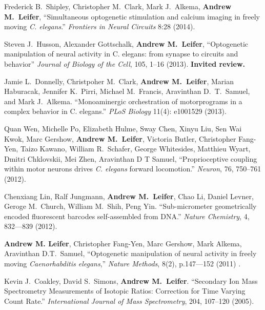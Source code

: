 \documentclass[11pt]{article}
\makeatletter
\newlength{\bibhang}
\newlength{\bibsep}
\newcounter{Lcount}
 {\@listi \global\bibsep\itemsep \global\advance\bibsep by\parsep}
\newenvironment{bibsection}%
        {\begin{list}{\arabic{Lcount}.}{%
       \usecounter{Lcount}%
       \setlength\labelwidth{-0.5em}%
       \setlength{\leftmargin}{\bibhang}%
       \setlength{\itemindent}{-\leftmargin}%
       \setlength{\itemsep}{\bibsep}%
       \setlength{\parsep}{\z@}%
        \setlength{\partopsep}{0pt}%
        \setlength{\topsep}{0pt}}}
        {\end{list}\vspace{-.6\baselineskip}}
\makeatother
\begin{document}
\begin{bibsection}
	
\item Frederick B.~Shipley, Christopher M.~Clark,  Mark J.~Alkema, \textbf{Andrew M.~Leifer}, ``Simultaneous optogenetic stimulation and calcium imaging in freely moving \textit{C. elegans}.'' \emph{Frontiers in Neural Circuits} 8:28 (2014).
	
\item Steven J.~Husson, Alexander Gottschalk, \textbf{Andrew M.~Leifer}, ``Optogenetic manipulation of neural activity in C. elegans: from synapse to circuits and behavior'' \emph{Journal of Biology of the Cell}, 105, 1--16 (2013).  \textbf{Invited review.}

\item Jamie L.~Donnelly, Christpoher M.~Clark, \textbf{Andrew M.~Leifer}, Marian Haburacak, Jennifer K.~Pirri, Michael M.~Francis, Aravinthan D.~T.~Samuel, and Mark J.~Alkema. ``Monoaminergic orchestration of motorprograms in a complex behavior in C. elegans.'' \emph{PLoS Biology}  11(4): e1001529 (2013).	

\item Quan Wen, Michelle Po, Elizabeth Hulme, Sway Chen, Xinyu Liu, Sen Wai Kwok, Marc Gershow,  \textbf{Andrew M.~Leifer}, Victoria Butler, Christopher Fang-Yen, Taizo Kawano, William R.~Schafer, George Whitesides, Matthieu Wyart, Dmitri Chklovskii, Mei Zhen, Aravinthan D T Samuel, ``Proprioceptive coupling within motor neurons drives \emph{C. elegans} forward locomotion.'' \emph{Neuron}, 76, 750--761 (2012).

\item Chenxiang Lin, Ralf Jungmann, \textbf{Andrew M.~Leifer}, Chao Li, Daniel Levner, Geroge M.~Church, William M.~Shih, Peng Yin. ``Sub-micrometer geometrically encoded fluorescent barcodes self-assembled from DNA.'' \emph{Nature Chemistry}, 4, 832--–839 (2012).

\item \textbf{Andrew M. Leifer}, Christopher Fang-Yen, Marc Gershow, Mark Alkema, Aravinthan D.T.~Samuel, ``Optogenetic manipulation of neural activity in freely moving \emph{Caenorhabditis elegans},'' \emph{Nature Methods}, 8(2), p.147–--152 (2011) . 

\item Kevin J.~Coakley, David S.~Simons, \textbf{Andrew M.~Leifer}. ``Secondary Ion Mass Spectrometry Measurements of Isotopic Ratios: Correction for Time Varying Count Rate.'' \emph{International Journal of Mass Spectrometry}, 204, 107--120 (2005).

\end{bibsection}
\end{document}
